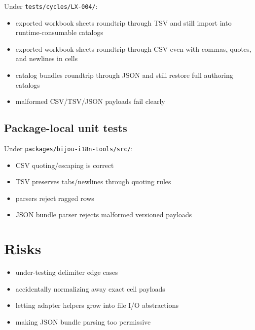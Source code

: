 Under \texttt{t\allowbreak{}e\allowbreak{}s\allowbreak{}t\allowbreak{}s\allowbreak{}/\allowbreak{}c\allowbreak{}y\allowbreak{}c\allowbreak{}l\allowbreak{}e\allowbreak{}s\allowbreak{}/\allowbreak{}L\allowbreak{}X\allowbreak{}-\allowbreak{}0\allowbreak{}0\allowbreak{}4\allowbreak{}/}:

\begin{itemize}
\tightlist
\item
  exported workbook sheets roundtrip through TSV and still import into runtime-consumable catalogs
\item
  exported workbook sheets roundtrip through CSV even with commas, quotes, and newlines in cells
\item
  catalog bundles roundtrip through JSON and still restore full authoring catalogs
\item
  malformed CSV/TSV/JSON payloads fail clearly
\end{itemize}

\subsection{Package-local unit tests}\label{record-191-package-local-unit-tests}

Under \texttt{p\allowbreak{}a\allowbreak{}c\allowbreak{}k\allowbreak{}a\allowbreak{}g\allowbreak{}e\allowbreak{}s\allowbreak{}/\allowbreak{}b\allowbreak{}i\allowbreak{}j\allowbreak{}o\allowbreak{}u\allowbreak{}-\allowbreak{}i\allowbreak{}1\allowbreak{}8\allowbreak{}n\allowbreak{}-\allowbreak{}t\allowbreak{}o\allowbreak{}o\allowbreak{}l\allowbreak{}s\allowbreak{}/\allowbreak{}s\allowbreak{}r\allowbreak{}c\allowbreak{}/}:

\begin{itemize}
\tightlist
\item
  CSV quoting/escaping is correct
\item
  TSV preserves tabs/newlines through quoting rules
\item
  parsers reject ragged rows
\item
  JSON bundle parser rejects malformed versioned payloads
\end{itemize}

\section{Risks}\label{record-191-risks}

\begin{itemize}
\tightlist
\item
  under-testing delimiter edge cases
\item
  accidentally normalizing away exact cell payloads
\item
  letting adapter helpers grow into file I/O abstractions
\item
  making JSON bundle parsing too permissive
\end{itemize}

